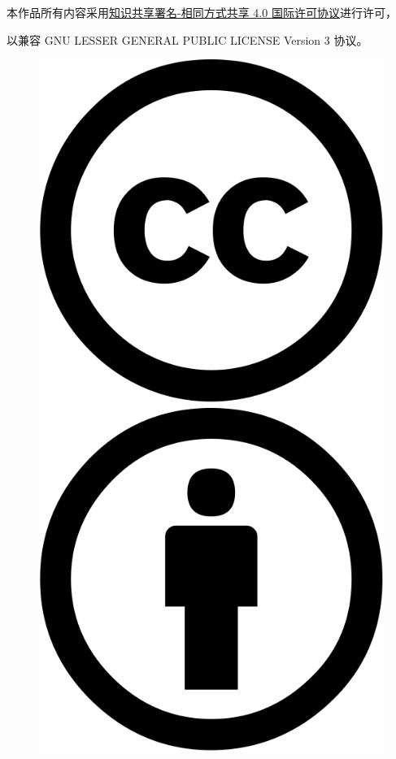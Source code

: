 \documentclass[UTF-8]{ctexart}
\begin{document}
	\newpage
	
	\vspace*{\fill}
	\begin{center}
		{\large
		本作品所有内容采用\href{http://creativecommons.org/licenses/by-sa/4.0}{知识共享署名-相同方式共享 4.0 国际许可协议}进行许可，
		
		以兼容 GNU LESSER GENERAL PUBLIC LICENSE Version 3 协议。
		}
		\begin{figure}[H]
			\centering
			\begin{minipage}{0.15\textwidth}
				\centering
				\includegraphics[width=\textwidth]{fig/cc.xlarge.png}
				\caption*{}
			\end{minipage}
			\begin{minipage}{0.15\textwidth}
				\centering
				\includegraphics[width=\textwidth]{fig/by.xlarge.png}

\end{minipage}
\end{figure}
\end{center}
\end{document}
